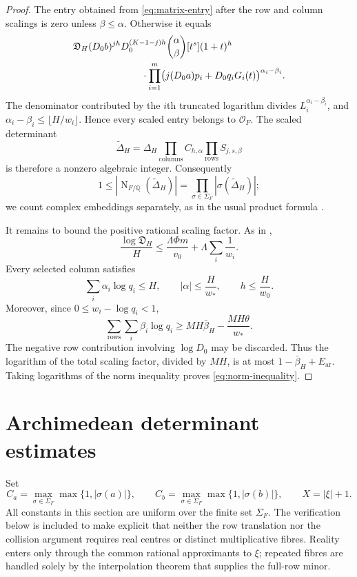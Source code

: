 \documentclass[11pt]{article}
\newcommand{\QQ}{\mathbb Q}
\newcommand{\OO}{\mathcal O}
\DeclareMathOperator{\Nm}{N}
\theoremstyle{definition}
\theoremstyle{remark}
\numberwithin{equation}{section}
\begin{document}
\begin{proof}
The entry obtained from \eqref{eq:matrix-entry} after the row and column
scalings is zero unless $\beta\le\alpha$.  Otherwise it equals
\begin{align*}
 &\mathfrak D_H(D_0b)^{jh}D_0^{(K-1-j)h}
 \binom\alpha\beta[t^s](1+t)^h\\
 &\hspace{25mm}\cdot
 \prod_{i=1}^m
 \bigl(j(D_0a)p_i+D_0q_iG_i(t)\bigr)^{\alpha_i-\beta_i}.
\end{align*}
The denominator contributed by the $i$th truncated logarithm divides
$L_i^{\alpha_i-\beta_i}$, and
$\alpha_i-\beta_i\le\lfloor H/w_i\rfloor$.  Hence every scaled entry
belongs to $\OO_F$.  The scaled determinant
\[
 \widetilde\Delta_H
 =\Delta_H\prod_{\text{columns}}C_{h,\alpha}
             \prod_{\text{rows}}S_{j,s,\beta}
\]
is therefore a nonzero algebraic integer.  Consequently
\[
 1\le|\Nm_{F/\QQ}(\widetilde\Delta_H)|
 =\prod_{\sigma\in\Sigma_F}|\sigma(\widetilde\Delta_H)|;
\]
we count complex embeddings separately, as in the usual product formula
\cite[Chapter~I]{Neukirch1999}.

It remains to bound the positive rational scaling factor.  As in
\cite[Section~4]{LiuJiangZhang2026},
\[
 \frac{\log\mathfrak D_H}{H}
 \le\frac{\Lambda\Phi m}{v_0}
    +\Lambda\sum_i\frac1{w_i}.
\]
Every selected column satisfies
\[
 \sum_i\alpha_i\log q_i\le H,
 \qquad |\alpha|\le\frac H{w_*},
 \qquad h\le\frac H{w_0}.
\]
Moreover, since $0\le w_i-\log q_i<1$,
\[
 \sum_{\text{rows}}\sum_i\beta_i\log q_i
 \ge MH\bar\beta_H-\frac{MH\theta}{w_*}.
\]
The negative row contribution involving $\log D_0$ may be discarded.
Thus the logarithm of the total scaling factor, divided by $MH$, is at
most $1-\bar\beta_H+E_{\mathrm{ar}}$.  Taking logarithms of the norm
inequality proves \eqref{eq:norm-inequality}.
\end{proof}

\section{Archimedean determinant estimates}\label{sec:analytic}

Set
\[
 C_a=\max_{\sigma\in\Sigma_F}\max\{1,|\sigma(a)|\},
 \qquad
 C_b=\max_{\sigma\in\Sigma_F}\max\{1,|\sigma(b)|\},
 \qquad X=|\xi|+1.
\]
All constants in this section are uniform over the finite set
$\Sigma_F$.  The verification below is included to make explicit that
neither the row translation nor the collision argument requires real
centres or distinct multiplicative fibres.  Reality enters only through
the common rational approximants to $\xi$; repeated fibres are handled
solely by the interpolation theorem that supplies the full-row minor.
\end{document}
